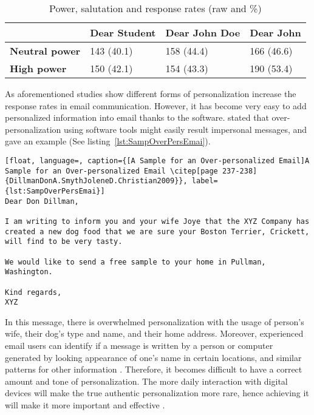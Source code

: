 \begin{table}[!ht]
\begin{center}
	\caption[Power, salutation and response rates (raw and \%)]{Power, salutation and response rates (raw and \%) \citep{Joinson2007}} \label{tab:pow_sal_res}
    \begin{tabular}{ p{3cm} p{3cm}  p{3cm}  p{3cm} }
	\hline
	& \textbf{Dear Student} & \textbf{Dear John Doe} & \textbf{Dear John} \\ \hline
	\textbf{Neutral power} & 143 (40.1) & 158 (44.4) & 166 (46.6) \\
	\textbf{High power} & 150 (42.1) & 154 (43.3) & 190 (53.4) \\ \hline
    \end{tabular}
\end{center}
\end{table}

As aforementioned studies show different forms of personalization increase the response rates in email communication. However, it has become very easy to add personalized information into email thanks to the software. \citet[page 237-238]{DillmanDonA.SmythJoleneD.Christian2009} stated that over-personalization using software tools might easily result impersonal messages, and gave an example (See listing~\ref{lst:SampOverPersEmai}).
\vspace{1cm}


\begin{lstlisting}[float, language=, caption={[A Sample for an Over-personalized Email]A Sample for an Over-personalized Email \citep[page 237-238]{DillmanDonA.SmythJoleneD.Christian2009}}, label={lst:SampOverPersEmai}]
Dear Don Dillman,

I am writing to inform you and your wife Joye that the XYZ Company has created a new dog food that we are sure your Boston Terrier, Crickett, will find to be very tasty. 

We would like to send a free sample to your home in Pullman, Washington.

Kind regards,
XYZ
\end{lstlisting}

In this message, there is overwhelmed personalization with the usage of person's wife, their dog's type and name, and their home address. Moreover, experienced email users can identify if a message is written by a person or computer generated by looking appearance of one's name in certain locations, and similar patterns for other information \citep[page 272]{DillmanDonA.SmythJoleneD.Christian2009}. Therefore, it becomes difficult to have a correct amount and tone of personalization. The more daily interaction with digital devices will make the true authentic personalization more rare, hence achieving it will make it more important and effective \citep[page 238]{DillmanDonA.SmythJoleneD.Christian2009}.

